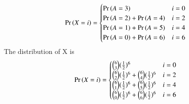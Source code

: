 \documentclass[journal,12pt,twocolumn]{IEEEtran}
\begin{document}
\begin{align}
        \Pr\left(X=i\right) = 
        \begin{cases}
            \Pr\left(A=3\right) & i=0\\
            \Pr\left(A=2\right)+\Pr\left(A=4\right) & i=2\\
            \Pr\left(A=1\right)+\Pr\left(A=5\right) & i=4\\
            \Pr\left(A=0\right)+\Pr\left(A=6\right) & i=6
        \end{cases}
    \end{align}
The distribution of X is
\begin{align}
        \Pr\left(X=i\right) = 
        \begin{cases}
            \binom{6}{3}(\frac{1}{2})^6 & i=0\\
            \binom{6}{2}(\frac{1}{2})^6 + \binom{6}{4}(\frac{1}{2})^6 & i=2\\
            \binom{6}{1}(\frac{1}{2})^6 + \binom{6}{5}(\frac{1}{2})^6 & i=4\\
            \binom{6}{0}(\frac{1}{2})^6 + \binom{6}{6}(\frac{1}{2})^6& i=6
        \end{cases}
    \end{align}
\end{document}
